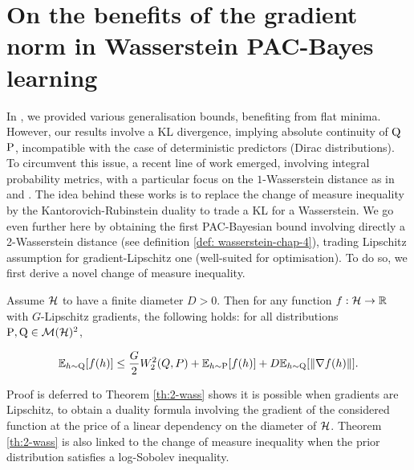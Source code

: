 \section{On the benefits of the gradient norm in Wasserstein PAC-Bayes learning}

In , we provided various generalisation bounds, benefiting from flat minima.
However, our results involve a KL divergence, implying absolute continuity of $\Q$ \wrt $\P$, incompatible with the case of deterministic predictors (Dirac distributions).
To circumvent this issue, a recent line of work emerged, involving integral probability metrics, with a particular focus on the $1$-Wasserstein distance as in  and \citet{amit2022integral}.
The idea behind these works is to replace the change of measure inequality  \citep{csizar1975divergence,donsker1976asymp} by the Kantorovich-Rubinstein duality \citep{villani2009optimal} to trade a KL for a Wasserstein.
We go even further here by obtaining the first PAC-Bayesian bound involving directly a 2-Wasserstein distance (see definition \ref{def: wasserstein-chap-4}), trading Lipschitz assumption for gradient-Lipschitz one (well-suited for optimisation). To do so, we first derive a novel change of measure inequality.

\begin{theorem}
  \label{th:2-wass}
  Assume $\Hcal$ to have a finite diameter $D>0$. Then for any function $f:\Hcal\rightarrow \Rbb$ with $G$-Lipschitz gradients, the following holds: for all distributions $\P,\Q\in\Mcal(\Hcal)^2$, 

  \[ \mathbb{E}_{h\sim \Q}[f(h)] \leq \frac{G}{2}W_2^2(Q,P) + \mathbb{E}_{h\sim \P}[f(h)] +D \mathbb{E}_{h\sim\Q}[\|\nabla f (h)\|].  \]
\end{theorem}
Proof is deferred to 
Theorem \ref{th:2-wass} shows it is possible when gradients are Lipschitz, to obtain a duality formula involving the gradient of the considered function at the price of a linear dependency on the diameter of $\Hcal$.
Theorem \ref{th:2-wass} is also linked to the change of measure inequality when the prior distribution satisfies a log-Sobolev inequality. 

